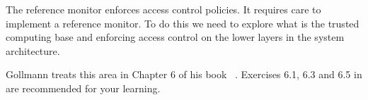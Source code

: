 The reference monitor enforces access control policies.
It requires care to implement a reference monitor.
To do this we need to explore what is the trusted computing base and enforcing 
access control on the lower layers in the system architecture.

Gollmann treats this area in Chapter 6 of his book 
~\cite{Gollmann2011cs}.
Exercises 6.1, 6.3 and 6.5 in \cite{Gollmann2011cs} are recommended for your 
learning.
